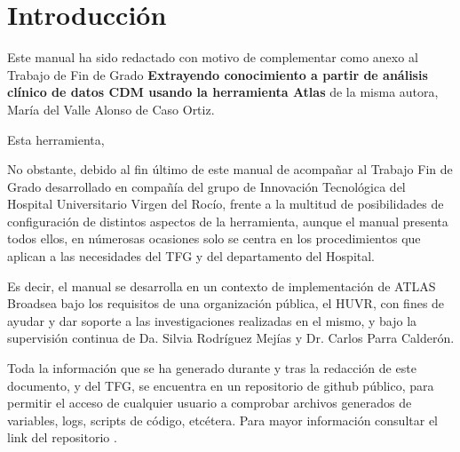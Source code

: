 \chapter{Introducción} \label{cap:01Introduccion}

Este manual ha sido redactado con motivo de complementar como anexo al Trabajo de Fin de Grado %
\textbf{Extrayendo conocimiento a partir de análisis clínico de datos CDM usando la herramienta Atlas} %
de la misma autora, María del Valle Alonso de Caso Ortiz.

Esta herramienta, 

No obstante, debido al fin último de este manual de acompañar al Trabajo Fin de Grado desarrollado en compañía del grupo de Innovación Tecnológica del Hospital Universitario Virgen del Rocío,  frente a la multitud de posibilidades de configuración de distintos aspectos de la herramienta, aunque el manual presenta todos ellos, en númerosas ocasiones solo se centra en los procedimientos que aplican a las necesidades del TFG y del departamento del Hospital.

Es decir, el manual se desarrolla en un contexto de implementación de ATLAS Broadsea bajo los requisitos de una organización pública, el HUVR, con fines de ayudar y dar soporte a las investigaciones realizadas en el mismo, y bajo la supervisión continua de Da. Silvia Rodríguez Mejías y Dr. Carlos Parra Calderón.


Toda la información que se ha generado durante y tras la redacción de este documento, y del TFG, se encuentra en un repositorio de github público, para permitir el acceso de cualquier usuario a comprobar archivos generados de variables, logs, scripts de código, etcétera. Para mayor información consultar el link del repositorio \cite{vallealonsodc}.






